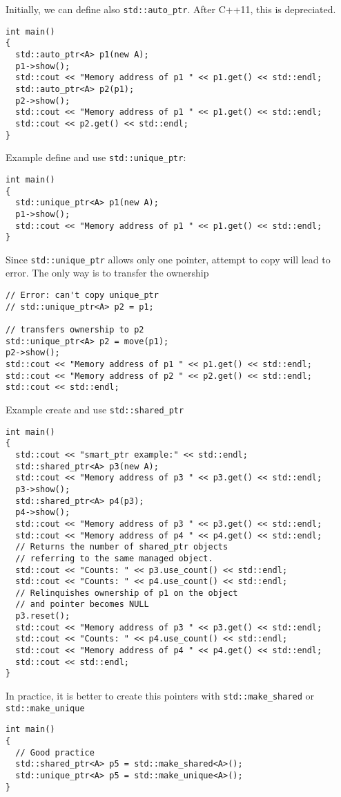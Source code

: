 Initially, we can define also \verb|std::auto_ptr|. After C++11, this is depreciated.
\begin{verbatim}
int main()
{
  std::auto_ptr<A> p1(new A);
  p1->show();
  std::cout << "Memory address of p1 " << p1.get() << std::endl;
  std::auto_ptr<A> p2(p1);
  p2->show();
  std::cout << "Memory address of p1 " << p1.get() << std::endl;
  std::cout << p2.get() << std::endl;
}
\end{verbatim}

Example define and use \verb|std::unique_ptr|:
\begin{verbatim}
int main()
{
  std::unique_ptr<A> p1(new A);
  p1->show();
  std::cout << "Memory address of p1 " << p1.get() << std::endl;
}
\end{verbatim}

Since \verb|std::unique_ptr| allows only one pointer, attempt to copy will lead to error. The only way is to transfer the ownership
\begin{verbatim}
// Error: can't copy unique_ptr
// std::unique_ptr<A> p2 = p1;

// transfers ownership to p2
std::unique_ptr<A> p2 = move(p1);
p2->show();
std::cout << "Memory address of p1 " << p1.get() << std::endl;
std::cout << "Memory address of p2 " << p2.get() << std::endl;
std::cout << std::endl;
\end{verbatim}
Example create and use \verb|std::shared_ptr|

\begin{verbatim}
int main()
{
  std::cout << "smart_ptr example:" << std::endl;
  std::shared_ptr<A> p3(new A);
  std::cout << "Memory address of p3 " << p3.get() << std::endl;
  p3->show();
  std::shared_ptr<A> p4(p3);
  p4->show();
  std::cout << "Memory address of p3 " << p3.get() << std::endl;
  std::cout << "Memory address of p4 " << p4.get() << std::endl;  
  // Returns the number of shared_ptr objects
  // referring to the same managed object.
  std::cout << "Counts: " << p3.use_count() << std::endl;
  std::cout << "Counts: " << p4.use_count() << std::endl;
  // Relinquishes ownership of p1 on the object
  // and pointer becomes NULL
  p3.reset();
  std::cout << "Memory address of p3 " << p3.get() << std::endl;
  std::cout << "Counts: " << p4.use_count() << std::endl;
  std::cout << "Memory address of p4 " << p4.get() << std::endl;
  std::cout << std::endl;
}
\end{verbatim}

In practice, it is better to create this pointers with \verb|std::make_shared| or \verb|std::make_unique|
\begin{verbatim}
int main()
{
  // Good practice
  std::shared_ptr<A> p5 = std::make_shared<A>();
  std::unique_ptr<A> p5 = std::make_unique<A>();
}
\end{verbatim}

